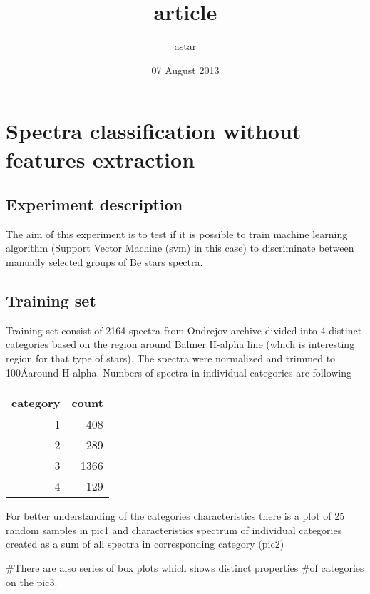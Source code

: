 \documentclass[11pt]{article}
\title{article}
\author{astar}
\date{07 August 2013}
\begin{document}
\maketitle

\setcounter{tocdepth}{3}
\tableofcontents
\vspace*{1cm}
\section{Spectra classification without features extraction}
\label{sec-1}

\subsection{Experiment description}
\label{sec-1.1}

   The aim of this experiment is to test if it is possible to train
   machine learning algorithm (Support Vector Machine (svm) in this case)
   to discriminate between manually selected groups of Be stars spectra. 
\subsection{Training set}
\label{sec-1.2}

   Training set consist of 2164 spectra from Ondrejov archive divided
   into 4 distinct categories based on the region around Balmer
   H-alpha line (which is interesting region for that type of
   stars). The spectra were normalized and trimmed to 100\AA around
   H-alpha. Numbers of spectra in individual categories are following


\begin{center}
\begin{tabular}{rr}
 category  &  count  \\
\hline
        1  &    408  \\
        2  &    289  \\
        3  &   1366  \\
        4  &    129  \\
\end{tabular}
\end{center}



   For better understanding of the categories characteristics there is
   a plot of 25 random samples in pic1 and characteristics spectrum of
   individual categories created as a sum of all spectra in
   corresponding category (pic2)
   
   \#There are also series of box plots which shows distinct properties
   \#of categories on the pic3. 
\end{document}
